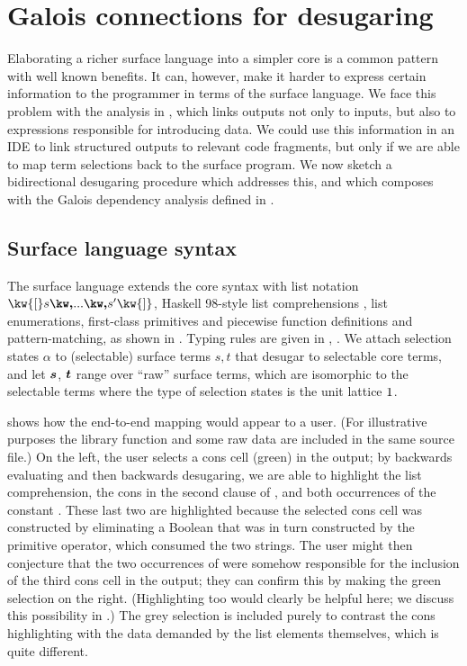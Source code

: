 \newpage
\section{Galois connections for desugaring}
\label{sec:surface-language}

Elaborating a richer surface language into a simpler core is a common pattern with well known benefits. It can, however, make it harder to express certain information to the programmer in terms of the surface language. We face this problem with the analysis in , which links outputs not only to inputs, but also to expressions responsible for introducing data. We could use this information in an IDE to link structured outputs to relevant code fragments, but only if we are able to map term selections back to the surface program. We now sketch a bidirectional desugaring procedure which addresses this, and which composes with the Galois dependency analysis defined in .



\subsection{Surface language syntax}

The surface language \OurLanguage{} extends the core syntax with list notation $\kw{[} s \comma \ldots \comma s' \kw{]}$, Haskell 98-style list comprehensions \cite{peytonJones03}, list enumerations, first-class primitives and piecewise function definitions and pattern-matching, as shown in . Typing rules are \ifappendices given in , \else \IncludedWithSupplementaryMaterial\fi. We attach selection states $\alpha$ to (selectable) surface terms $s, t$ that desugar to selectable core terms, and let $\bm{s}$, $\bm{t}$ range over ``raw'' surface terms, which are isomorphic to the selectable terms where the type of selection states is the unit lattice $1$.

 shows how the end-to-end mapping would appear to a user. (For illustrative purposes the library function  and some raw data are included in the same source file.) On the left, the user selects a cons cell (green) in the output; by backwards evaluating and then backwards desugaring, we are able to highlight the list comprehension, the cons in the second clause of , and both occurrences of the constant . These last two are highlighted because the selected cons cell was constructed by eliminating a Boolean that was in turn constructed by the primitive \kw{==} operator, which consumed the two strings. The user might then conjecture that the two occurrences of  were somehow responsible for the inclusion of the third cons cell in the output; they can confirm this by making the green selection on the right. (Highlighting \kw{==} too would clearly be helpful here; we discuss this possibility in .) The grey selection is included purely to contrast the cons highlighting with the data demanded by the list elements themselves, which is quite different.

